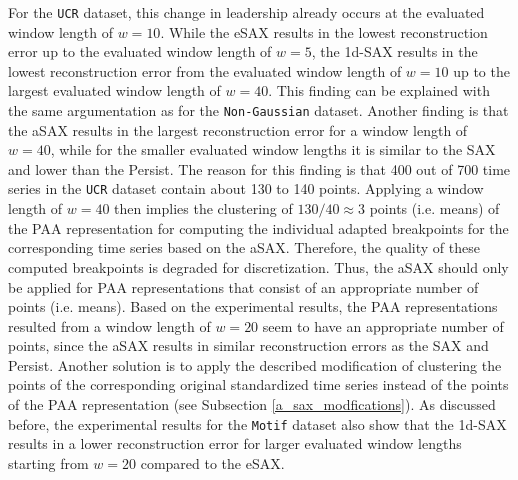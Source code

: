 For the \texttt{UCR} dataset, this change in leadership already occurs at the evaluated window length of $w = 10$. While the \ac{eSAX} results in the lowest reconstruction error up to the evaluated window length of $w = 5$, the \ac{1d-SAX} results in the lowest reconstruction error from the evaluated window length of $w = 10$ up to the largest evaluated window length of $w = 40$. This finding can be explained with the same argumentation as for the \texttt{Non-Gaussian} dataset. Another finding is that the \ac{aSAX} results in the largest reconstruction error for a window length of $w = 40$, while for the smaller evaluated window lengths it is similar to the \ac{SAX} and lower than the Persist. The reason for this finding is that 400 out of 700 time series in the \texttt{UCR} dataset contain about 130 to 140 points. Applying a window length of $w = 40$ then implies the clustering of $130 / 40 \approx 3$ points (i.e. means) of the \ac{PAA} representation for computing the individual adapted breakpoints for the corresponding time series based on the \ac{aSAX}. Therefore, the quality of these computed breakpoints is degraded for discretization. Thus, the \ac{aSAX} should only be applied for \ac{PAA} representations that consist of an appropriate number of points (i.e. means). Based on the experimental results, the \ac{PAA} representations resulted from a window length of $w = 20$ seem to have an appropriate number of points, since the \ac{aSAX} results in similar reconstruction errors as the \ac{SAX} and Persist. Another solution is to apply the described modification of clustering the points of the corresponding original standardized time series instead of the points of the \ac{PAA} representation (see Subsection \ref{a_sax_modfications}). \newline
As discussed before, the experimental results for the \texttt{Motif} dataset also show that the \ac{1d-SAX} results in a lower reconstruction error for larger evaluated window lengths starting from $w = 20$ compared to the \ac{eSAX}.
